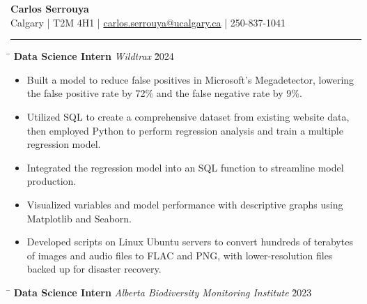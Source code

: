 \documentclass[a4paper,11pt]{article}
\def\locationh{\hspace{7cm}}
\def\titlev{\vspace{.5cm}}
\def\sectionv{\vspace{.2cm}}
\def\subsectionv{\vspace{-5.3ex}}
\def\postpointsv{\vspace{0cm}}
\def\betweenjobsv{\vspace{0.4cm}}
\begin{document}
\begin{center}
    {\LARGE \textbf{Carlos Serrouya}} \\
    Calgary | T2M 4H1 | \href{mailto:carlos.serrouya@ucalgary.ca}{carlos.serrouya@ucalgary.ca} | 250-837-1041 \\
\end{center}

\titlev

\noindent {}
\vspace{-2.35em} %
\par\noindent
\rule{\textwidth}{0.4pt}

\sectionv

\noindent \begin{tabbing}
    \locationh \= \kill
    \textbf{Data Science Intern} \> \textit{Wildtrax} \` 2024 \\
\end{tabbing}


\begin{itemize}[leftmargin=.5cm, itemsep=.1cm, before=\subsectionv, after=\postpointsv]
    \item Built a model to reduce false positives in Microsoft's Megadetector, lowering the false positive rate by 72\% and the false negative rate by 9\%.
    \item Utilized SQL to create a comprehensive dataset from existing website data, then employed Python to perform regression analysis and train a multiple regression model. 
    \item Integrated the regression model into an SQL function to streamline model production.
    \item Visualized variables and model performance with descriptive graphs using Matplotlib and Seaborn. 
    \item Developed scripts on Linux Ubuntu servers to convert hundreds of terabytes of images and audio files to FLAC and PNG, with lower-resolution files backed up for disaster recovery.
\end{itemize}

\betweenjobsv

\begin{tabbing}
    \locationh \= \kill
    \textbf{Data Science Intern} \> \textit{Alberta Biodiversity Monitoring Institute} \` 2023 \\
\end{tabbing}
\end{document}
